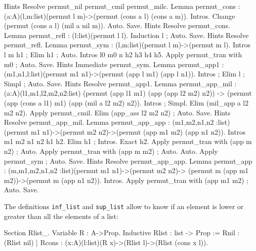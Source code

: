 \begin{coq_eval}
Hints Resolve permut_nil permut_cmil permut_milc.
Lemma permut_cons : (a:A)(l,m:list)(permut l m)->(permut (cons a l) (cons a m)).
        Intros.
        Change (permut (cons a l) (mil a nil m)).
        Auto.
Save.
Hints Resolve permut_cons.
Lemma permut_refl : (l:list)(permut l l).
        Induction l ; Auto.
Save.
Hints Resolve permut_refl.
Lemma permut_sym : (l,m:list)(permut l m)->(permut m l).
        Intros l m h1 ; Elim h1 ; Auto.
        Intros l0 m0 n h2 h3 h4 h5.
        Apply permut_tran with m0 ; Auto.
Save.
Hints Immediate permut_sym.
Lemma permut_app1 : (m1,n1,l:list)(permut m1 n1)->(permut (app l m1) (app l n1)).
        Intros ; Elim l ; Simpl ; Auto.
Save.
Hints Resolve permut_app1.
Lemma permut_app_mil : (a:A)(l1,m1,l2,m2,n2:list)
     (permut (app l1 m1) (app (app l2 m2) n2))
                -> (permut (app (cons a l1) m1) (app (mil a l2 m2) n2)).
        Intros ; Simpl.
        Elim (mil_app a l2 m2 n2).
        Apply permut_cmil.
        Elim (app_ass l2 m2 n2) ; Auto.
Save.
Hints Resolve permut_app_mil.
Lemma permut_app_app : (m1,m2,n1,n2 :list)
     (permut m1 n1)->(permut m2 n2)->(permut (app m1 m2) (app n1 n2)).
        Intros m1 m2 n1 n2 h1 h2.
        Elim h1 ; Intros.
        Exact h2.
        Apply permut_tran with (app m n2) ; Auto.
        Apply permut_tran with (app m m2) ; Auto.
        Auto.
        Apply permut_sym ; Auto.
Save.
Hints Resolve permut_app_app.
Lemma permut_app : (m,m1,m2,n1,n2 :list)(permut m1 n1)->(permut m2 n2)->
     (permut m (app m1 m2))->(permut m (app n1 n2)).
        Intros.
        Apply permut_tran with (app m1 m2) ; Auto.
Save.
\end{coq_eval}
The definitions \verb=inf_list= and \verb=sup_list= allow to know if
an element is lower or greater than all the elements of a list:
\begin{coq_example*}
Section Rlist_.
Variable R : A->Prop.
Inductive Rlist  : list -> Prop :=
    Rnil : (Rlist nil)
  | Rcons : (x:A)(l:list)(R x)->(Rlist l)->(Rlist (cons x l)).
\end{coq_example*}
